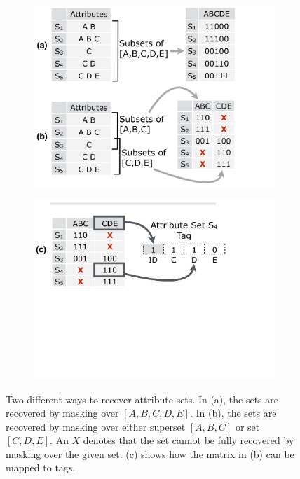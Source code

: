 \begin{figure}[t!] \begin{minipage}{1\linewidth}
\begin{subfigure}[b]{0.96\linewidth} \includegraphics[trim={0 0 5.5cm 0}, clip,
width=\linewidth]{figures/masking} \end{subfigure}
\begin{subfigure}[c]{0.96\linewidth} \includegraphics[trim={0 13cm 5.5cm 0},
clip, width=\linewidth]{figures/making_metadata} \end{subfigure} \end{minipage}
\caption{Two different ways to recover attribute sets.
In (a), the sets are recovered by masking over $[A,B,C,D,E]$. In (b), the sets
are recovered by masking over either superset $[A,B,C]$ or set $[C,D,E]$. An $X$
denotes that the set cannot be fully recovered by masking over the given set.
(c) shows how the matrix in (b) can be mapped to tags.}
\label{fig:masking} \end{figure}

